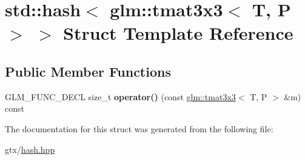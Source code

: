 \hypertarget{structstd_1_1hash_3_01glm_1_1tmat3x3_3_01T_00_01P_01_4_01_4}{\section{std\-:\-:hash$<$ glm\-:\-:tmat3x3$<$ T, P $>$ $>$ Struct Template Reference}
\label{structstd_1_1hash_3_01glm_1_1tmat3x3_3_01T_00_01P_01_4_01_4}
}
\subsection*{Public Member Functions}
\begin{DoxyCompactItemize}
\item 
\hypertarget{structstd_1_1hash_3_01glm_1_1tmat3x3_3_01T_00_01P_01_4_01_4_ac5073ce30608ee7a70e6c05ce0fba09a}{G\-L\-M\-\_\-\-F\-U\-N\-C\-\_\-\-D\-E\-C\-L size\-\_\-t {\bfseries operator()} (const \hyperlink{structglm_1_1tmat3x3}{glm\-::tmat3x3}$<$ T, P $>$ \&m) const }\label{structstd_1_1hash_3_01glm_1_1tmat3x3_3_01T_00_01P_01_4_01_4_ac5073ce30608ee7a70e6c05ce0fba09a}

\end{DoxyCompactItemize}


The documentation for this struct was generated from the following file\-:\begin{DoxyCompactItemize}
\item 
gtx/\hyperlink{hash_8hpp}{hash.\-hpp}\end{DoxyCompactItemize}
